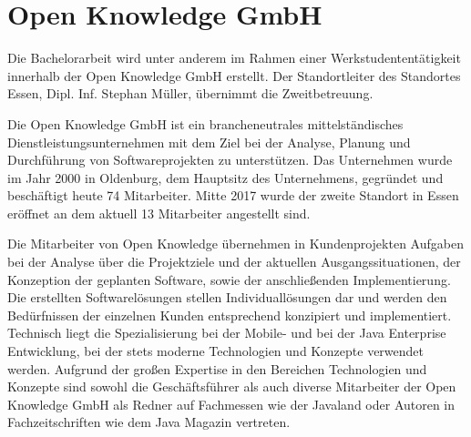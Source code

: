 
\section{Open Knowledge GmbH}


Die Bachelorarbeit wird unter anderem im Rahmen einer Werkstudententätigkeit innerhalb der Open Knowledge GmbH erstellt. Der Standortleiter des Standortes Essen, Dipl. Inf. Stephan Müller, übernimmt die Zweitbetreuung.

Die Open Knowledge GmbH ist ein brancheneutrales mittelständisches Dienstleistungsunternehmen mit dem Ziel bei der Analyse, Planung und Durchführung von Softwareprojekten zu unterstützen. Das Unternehmen wurde im Jahr 2000 in Oldenburg, dem Hauptsitz des Unternehmens, gegründet und beschäftigt heute 74 Mitarbeiter. Mitte 2017 wurde der zweite Standort in Essen eröffnet an dem aktuell 13 Mitarbeiter angestellt sind.

Die Mitarbeiter von Open Knowledge übernehmen in Kundenprojekten Aufgaben bei der Analyse über die Projektziele und der aktuellen Ausgangssituationen, der Konzeption der geplanten Software, sowie der anschließenden Implementierung. Die erstellten Softwarelösungen stellen Individuallösungen dar und werden den Bedürfnissen der einzelnen Kunden entsprechend konzipiert und implementiert. Technisch liegt die Spezialisierung bei der Mobile- und bei der Java Enterprise Entwicklung, bei der stets moderne Technologien und Konzepte verwendet werden. Aufgrund der großen Expertise in den Bereichen Technologien und Konzepte sind sowohl die Geschäftsführer als auch diverse Mitarbeiter der Open Knowledge GmbH als Redner auf Fachmessen wie der Javaland oder Autoren in Fachzeitschriften wie dem Java Magazin vertreten. \cite{VincentOpenKnowledge} %

%

\pagebreak
